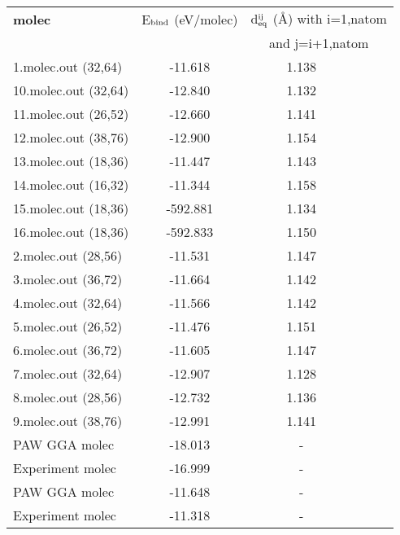 \documentclass[onecolumn]{revtex4}
\begin{document}
\begin{center}
\begin{tabular}{lccccc}
\hline
\hline
\bf{molec}&\multicolumn{2}{c}{E$_{\rm bind}$ (eV/molec)}&\multicolumn{3}{c}{d$_{\rm eq}^{\rm ij}$ (\AA) with i=1,natom} \\
&\multicolumn{2}{c}{}&\multicolumn{3}{c}{and j=i+1,natom} \\
\hline
1.molec.out (32,64)&\multicolumn{2}{c}{-11.618}&\multicolumn{2}{c}{1.138 } \\ 
10.molec.out (32,64)&\multicolumn{2}{c}{-12.840}&\multicolumn{2}{c}{1.132 } \\ 
11.molec.out (26,52)&\multicolumn{2}{c}{-12.660}&\multicolumn{2}{c}{1.141 } \\ 
12.molec.out (38,76)&\multicolumn{2}{c}{-12.900}&\multicolumn{2}{c}{1.154 } \\ 
13.molec.out (18,36)&\multicolumn{2}{c}{-11.447}&\multicolumn{2}{c}{1.143 } \\ 
14.molec.out (16,32)&\multicolumn{2}{c}{-11.344}&\multicolumn{2}{c}{1.158 } \\ 
15.molec.out (18,36)&\multicolumn{2}{c}{-592.881}&\multicolumn{2}{c}{1.134 } \\ 
16.molec.out (18,36)&\multicolumn{2}{c}{-592.833}&\multicolumn{2}{c}{1.150 } \\ 
2.molec.out (28,56)&\multicolumn{2}{c}{-11.531}&\multicolumn{2}{c}{1.147 } \\ 
3.molec.out (36,72)&\multicolumn{2}{c}{-11.664}&\multicolumn{2}{c}{1.142 } \\ 
4.molec.out (32,64)&\multicolumn{2}{c}{-11.566}&\multicolumn{2}{c}{1.142 } \\ 
5.molec.out (26,52)&\multicolumn{2}{c}{-11.476}&\multicolumn{2}{c}{1.151 } \\ 
6.molec.out (36,72)&\multicolumn{2}{c}{-11.605}&\multicolumn{2}{c}{1.147 } \\ 
7.molec.out (32,64)&\multicolumn{2}{c}{-12.907}&\multicolumn{2}{c}{1.128 } \\ 
8.molec.out (28,56)&\multicolumn{2}{c}{-12.732}&\multicolumn{2}{c}{1.136 } \\ 
9.molec.out (38,76)&\multicolumn{2}{c}{-12.991}&\multicolumn{2}{c}{1.141 } \\ 
PAW GGA molec~\cite{Paier_JCP122_2005} & \multicolumn{2}{c}{-18.013} & \multicolumn{2}{c}{-} \\ %
Experiment molec~\cite{Paier_JCP122_2005} & \multicolumn{2}{c}{-16.999} & \multicolumn{2}{c}{-} \\ %
PAW GGA molec~\cite{Paier_JCP122_2005} & \multicolumn{2}{c}{-11.648} & \multicolumn{2}{c}{-} \\ %
Experiment molec~\cite{Paier_JCP122_2005} & \multicolumn{2}{c}{-11.318} & \multicolumn{2}{c}{-} \\ %
\hline
\hline
\end{tabular}
\end{center}
\end{document}
